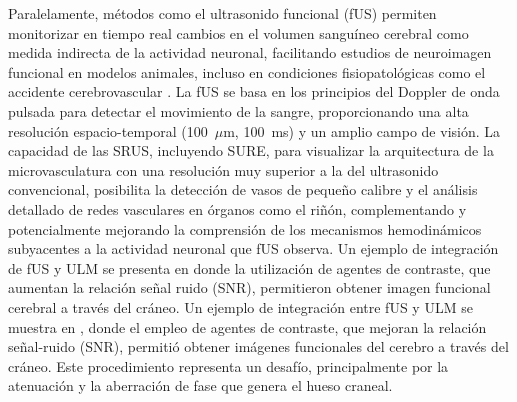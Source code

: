 \documentclass[10pt,a4paper]{article}
\begin{document}
Paralelamente, métodos como el ultrasonido funcional (fUS) permiten monitorizar en tiempo real cambios en el volumen sanguíneo cerebral como medida indirecta de la actividad neuronal, facilitando estudios de neuroimagen funcional en modelos animales, incluso en condiciones fisiopatológicas como el accidente cerebrovascular \cite{Montaldo2022_fus, Brunner2023}. La fUS se basa en los principios del Doppler de onda pulsada para detectar el movimiento de la sangre, proporcionando una alta resolución espacio-temporal (100~$\mu$m, 100~ms) y un amplio campo de visión. La capacidad de las SRUS, incluyendo SURE, para visualizar la arquitectura de la microvasculatura con una resolución muy superior a la del ultrasonido convencional, posibilita la detección de vasos de pequeño calibre y el análisis detallado de redes vasculares en órganos como el riñón, complementando y potencialmente mejorando la comprensión de los mecanismos hemodinámicos subyacentes a la actividad neuronal que fUS observa. Un ejemplo de integración de fUS y ULM se presenta en \cite{Jones2024} donde la utilización de agentes de contraste, que aumentan la relación señal ruido (SNR), permitieron obtener imagen funcional cerebral a través del cráneo. Un ejemplo de integración entre fUS y ULM se muestra en \cite{Jones2024}, donde el empleo de agentes de contraste, que mejoran la relación señal-ruido (SNR), permitió obtener imágenes funcionales del cerebro a través del cráneo. Este procedimiento representa un desafío, principalmente por la atenuación y la aberración de fase que genera el hueso craneal.

\end{document}
